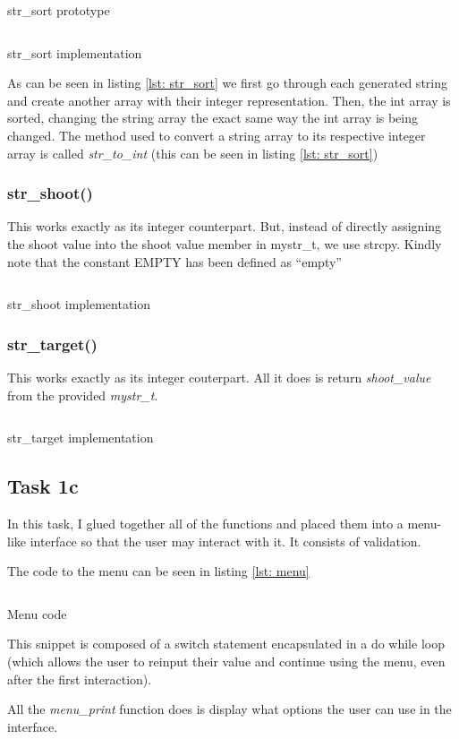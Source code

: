 \documentclass[a4paper, 12pt, titlepage]{article}
\newenvironment{code}{\captionsetup{type=listing}}{}
\newcommand{\sourcecode}[3]{
    \begin{code}
      \inputminted[linenos,numbersep=5pt,gobble=0,frame=lines,framesep=2mm,]{c}{#1}
        \caption{#2}
        \label{lst: #3}
    \end{code}
}
\begin{document}
\begin{onehalfspacing}
  \sourcecode{snippets/str_sort_header.c}{str\_sort prototype}{str_sort_prototype}
  \sourcecode{snippets/str_sort.c}{str\_sort implementation}{str_sort}

  As can be seen in listing \ref{lst: str_sort} we first go through each generated string and create another array with their integer representation. Then, the int array is sorted, changing the string array the exact same way the int array is being changed. The method used to convert a string array to its respective integer array is called \emph{str\_to\_int} (this can be seen in listing \ref{lst: str_sort})

  \subsubsection{str\_shoot()}
  This works exactly as its integer counterpart. But, instead of directly assigning the shoot value into the shoot value member in mystr\_t, we use strcpy. Kindly note that the constant EMPTY has been defined as ``empty''

  \sourcecode{snippets/str_shoot.c}{str\_shoot implementation}{str_shoot}

  \subsubsection{str\_target()}
  This works exactly as its integer couterpart. All it does is return \emph{shoot\_value} from the provided \emph{mystr\_t}.

  \sourcecode{snippets/str_target.c}{str\_target implementation}{str_target}

  \subsection{Task 1c}
  In this task, I glued together all of the functions and placed them into a menu-like interface so that the user may interact with it. It consists of validation.

  The code to the menu can be seen in listing \ref{lst: menu}

  \sourcecode{snippets/menu.c}{Menu code}{menu}

  This snippet is composed of a switch statement encapsulated in a do while loop (which allows the user to reinput their value and continue using the menu, even after the first interaction).

  All the \emph{menu\_print} function does is display what options the user can use in the interface.


\end{onehalfspacing}
\end{document}
